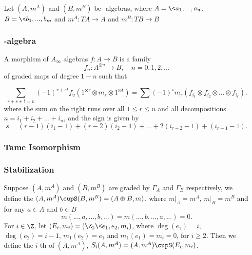 

Let $(A,m^A)$ and $(B, m^B)$ be \Ainf-algebras, where
$A = \<{a_1,...,a_n}$, $B = \<{b_1,...,b_m}$ and 
$m^A : TA \to A$ and $m^B : TB \to B$ 

\subsubsection{\Ainf-algebra}
A morphism of $A_\infty$ algebras $f: A \to B$ is a family 
\[ f_n: A^{\otimes n} \to B, \quad n= 0,1,2,... \]
of graded maps of degree $1-n$ such that

\[ \sum_{r+s+t=n} (-1)^{r+st} f_u(1^{\otimes r} \otimes m_s \otimes 1^{\otimes t}) 
= \sum (-1)^s m_r(f_{i_1} \otimes f_{i_2} \otimes ... \otimes f_{i_r}). \]
%
where the sum on the right runs over all $1\le r\le n$ and all decompositions 
$n = i_1 + i_2 + ... + i_n$, and the sign is given by 
\[ s = (r-1)(i_1-1) + (r-2)(i_2 - 1) + ... + 2(i_{r-2} - 1) + (i_{r-1} - 1). \] 



\subsubsection{Tame Isomorphism}



% 
% 
\subsubsection{Stabilization}
Suppose $(A,m^A)$ and $(B,m^B)$ are graded by $\Gamma_A$ and $\Gamma_B$
respectively, we define the  
$(A,m^A) \cupS (B, m^B) = (A \oplus B, m)$, where 
$m|_A = m^A$, $m|_B = m^B$ and for any $a\in A$ and $b \in B$
\[ m(...,a,...,b,...) = m(...,b,...,a,...) = 0. \] 
For $i\in \Z$, let $(E_i, m_i) = (\Z_2\<{e_1,e_2}, m_i )$, where $\deg(e_1) = i$,
$\deg(e_2) = i-1$, $m_1(e_2) = e_1$ and $m_1(e_1) = m_i = 0$, 
for $i\ge 2$. Then we define the $i$-th  of $(A,m^A)$,
$S_i(A,m^A) = (A,m^A) \cupS (E_i, m_i)$.

